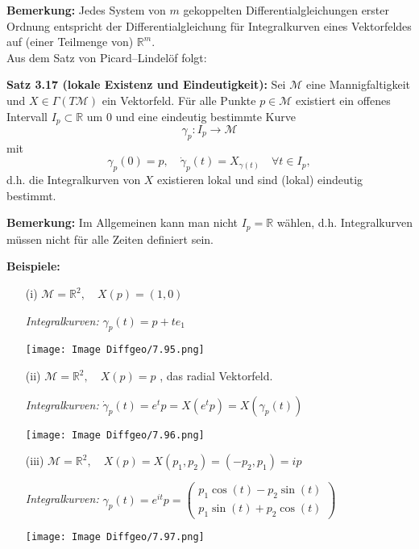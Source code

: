 \documentclass[fleqn, 12pt, letterpaper]{article}
\begin{document}
\textbf{Bemerkung:}  
Jedes System von \(m\) gekoppelten Differentialgleichungen erster Ordnung entspricht der Differentialgleichung für Integralkurven eines Vektorfeldes auf (einer Teilmenge von) \(\mathbb{R}^m\).\\


Aus dem Satz von Picard–Lindelöf folgt:

\textbf{Satz 3.17 (lokale Existenz und Eindeutigkeit):}  
Sei \(\mathcal{M}\) eine Mannigfaltigkeit und \(X \in \Gamma(T\mathcal{M})\) ein Vektorfeld.  
Für alle Punkte \(p \in \mathcal{M}\) existiert ein offenes Intervall \(I_p \subset \mathbb{R}\) um \(0\) und eine eindeutig bestimmte Kurve
\[
\gamma_p: I_p \to \mathcal{M}
\]
mit
\[
\gamma_p(0) = p, \quad \dot{\gamma}_p(t) = X_{\gamma(t)} \quad \forall t \in I_p,
\]
d.h. die Integralkurven von \(X\) existieren lokal und sind (lokal) eindeutig bestimmt.

\vspace{0.5em}

\textbf{Bemerkung:}  
Im Allgemeinen kann man nicht \(I_p = \mathbb{R}\) wählen, d.h. Integralkurven müssen nicht für alle Zeiten definiert sein.


\textbf{Beispiele:}

\begin{itemize}
  \item[(i)] \(\mathcal{M} = \mathbb{R}^2,\quad X(p) = (1,0)\)  
  
  \textit{Integralkurven:} \(\gamma_p(t) = p+te_1\)
  
\texttt{[image: Image Diffgeo/7.95.png]}

  \item[(ii)] \(\mathcal{M} = \mathbb{R}^2,\quad X(p) = p\) , das radial Vektorfeld. 
  
  \textit{Integralkurven:} \(\dot\gamma_p(t) = e^tp=X(e^tp)=X(\gamma_p(t))\)

 \texttt{[image: Image Diffgeo/7.96.png]}


  \item[(iii)] \(\mathcal{M} = \mathbb{R}^2,\quad X(p) = X(p_1, p_2) = (-p_2,p_1) =ip\)
  
  \textit{Integralkurven:} \(\gamma_p(t) = e^{it}p = \left( \begin{array}{c} p_1\cos(t)-p_2\sin(t) \\ p_1\sin(t)+p_2\cos(t) \end{array} \right)\)

  
  \texttt{[image: Image Diffgeo/7.97.png]}

\end{itemize}
\end{document}
